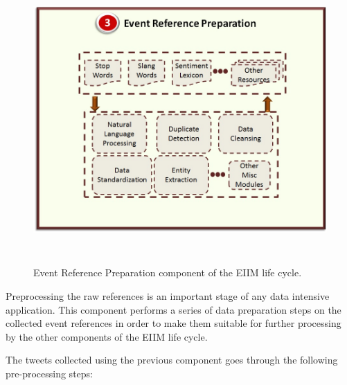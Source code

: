 \begin{figure}[htbp]
  \caption{Event Reference Preparation component of the EIIM life cycle.}
  \centering
    \includegraphics[width=14cm,height=11cm]{Figures/EIIMComponents/EventReferencePreparation.jpg}
\end{figure}

Preprocessing the raw references is an important stage of any data intensive application. This component performs a series of data preparation steps on the collected event references in order to make them suitable for further processing by the other components of the EIIM life cycle. 


The tweets collected using the previous component goes through the following pre-processing steps:

